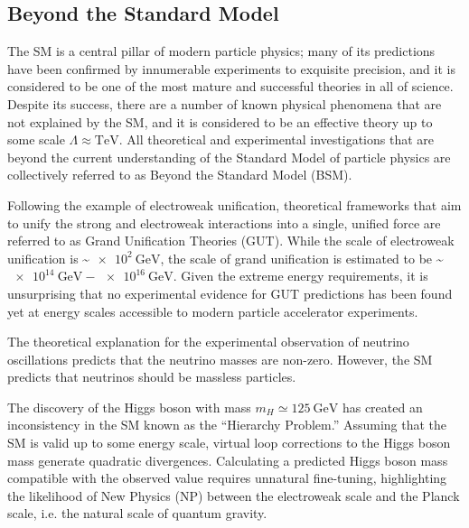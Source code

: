 \begin{refsection}
\section{Beyond the Standard Model}
The SM is a central pillar of modern particle physics; many of its predictions have been confirmed by innumerable experiments to exquisite precision, and it is considered to be one of the most mature and successful theories in all of science.
Despite its success, there are a number of known physical phenomena that are not explained by the SM, and it is considered to be an effective theory up to some scale $\Lambda \approx \si{\TeV}$.
All theoretical and experimental investigations that are beyond the current understanding of the Standard Model of particle physics are collectively referred to as Beyond the Standard Model (BSM).

Following the example of electroweak unification, theoretical frameworks that aim to unify the strong and electroweak interactions into a single, unified force are referred to as Grand Unification Theories (GUT).
While the scale of electroweak unification is \sim$\SI{e2}{\GeV}$, the scale of grand unification is estimated to be \sim$\SI{e14}{\GeV} - \SI{e16}{\GeV}$.
Given the extreme energy requirements, it is unsurprising that no experimental evidence for GUT predictions has been found yet at energy scales accessible to modern particle accelerator experiments.

The theoretical explanation for the experimental observation of neutrino oscillations predicts that the neutrino masses are non-zero.
However, the SM predicts that neutrinos should be massless particles. 

The discovery of the Higgs boson with mass $m_H \simeq \SI{125}{\GeV}$ has created an inconsistency in the SM known as the ``Hierarchy Problem.''
Assuming that the SM is valid up to some energy scale, virtual loop corrections to the Higgs boson mass generate quadratic divergences.
Calculating a predicted Higgs boson mass compatible with the observed value requires unnatural fine-tuning, highlighting the likelihood of New Physics (NP) between the electroweak scale and the Planck scale, i.e. the natural scale of quantum gravity.


\end{refsection}
